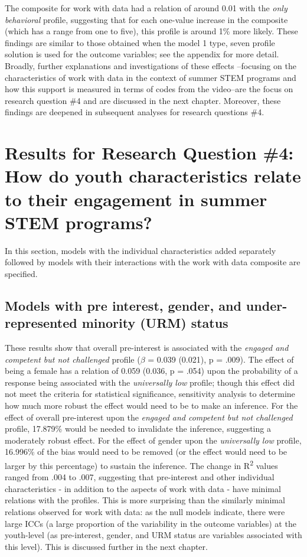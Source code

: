 \documentclass[]{msu-thesis}
\theoremstyle{definition}
\theoremstyle{definition}
\theoremstyle{definition}
\theoremstyle{remark}
\begin{document}
The composite for work with data had a relation of around 0.01 with the
\emph{only behavioral} profile, suggesting that for each one-value
increase in the composite (which has a range from one to five), this
profile is around 1\% more likely. These findings are similar to those
obtained when the model 1 type, seven profile solution is used for the
outcome variables; see the appendix for more detail. Broadly, further
explanations and investigations of these effects --focusing on the
characteristics of work with data in the context of summer STEM programs
and how this support is measured in terms of codes from the video--are
the focus on research question \#4 and are discussed in the next
chapter. Moreover, these findings are deepened in subsequent analyses
for research questions \#4.

\section{Results for Research Question \#4: How do youth characteristics
relate to their engagement in summer STEM
programs?}\label{results-for-research-question-4-how-do-youth-characteristics-relate-to-their-engagement-in-summer-stem-programs}

In this section, models with the individual characteristics added
separately followed by models with their interactions with the work with
data composite are specified.

\subsection{Models with pre interest, gender, and under-represented
minority (URM)
status}\label{models-with-pre-interest-gender-and-under-represented-minority-urm-status}

These results show that overall pre-interest is associated with the
\emph{engaged and competent but not challenged} profile (\(\beta\) =
0.039 (0.021), p = .009). The effect of being a female has a relation of
0.059 (0.036, p = .054) upon the probability of a response being
associated with the \emph{universally low} profile; though this effect
did not meet the criteria for statistical significance, sensitivity
analysis to determine how much more robust the effect would need to be
to make an inference. For the effect of overall pre-interest upon the
\emph{engaged and competent but not challenged} profile, 17.879\% would
be needed to invalidate the inference, suggesting a moderately robust
effect. For the effect of gender upon the \emph{universally low}
profile, 16.996\% of the bias would need to be removed (or the effect
would need to be larger by this percentage) to sustain the inference.
The change in R\textsuperscript{2} values ranged from .004 to .007,
suggesting that pre-interest and other individual characteristics - in
addition to the aspects of work with data - have minimal relations with
the profiles. This is more surprising than the similarly minimal
relations observed for work with data: as the null models indicate,
there were large ICCs (a large proportion of the variability in the
outcome variables) at the youth-level (as pre-interest, gender, and URM
status are variables associated with this level). This is discussed
further in the next chapter.
\end{document}
